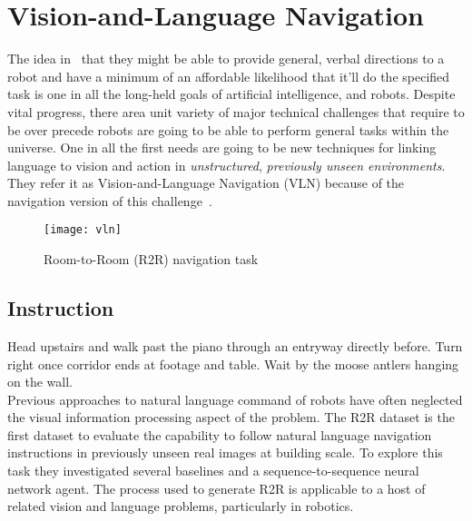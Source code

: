 \section{Vision-and-Language Navigation}
The idea in~\cite{DBLP:journals/corr/abs-1711-07280} that they might be able to provide general, verbal directions to a robot and have a minimum of an affordable likelihood that it'll do the specified task is one in all the long-held goals of artificial intelligence, and robots.
Despite vital progress, there area unit variety of major technical challenges that require to be over precede robots are going to be able to perform general tasks within the universe. One in all the first needs are going to be new techniques for linking language to vision and action in \emph{unstructured}, \emph{previously unseen environments}. They refer it as Vision-and-Language Navigation (VLN) because of the navigation version of this challenge~\cite{DBLP:journals/corr/abs-1711-07280}.

\begin{figure}[htbp]
    \centering
    \texttt{[image: vln]}
    \caption{Room-to-Room (R2R) navigation task~\cite{DBLP:journals/corr/abs-1711-07280}}
\end{figure}
\newpage
\subsection*{Instruction}
Head upstairs and walk past the piano through an entryway directly before. Turn right once corridor ends at footage and table. Wait by the moose antlers hanging on the wall.\\

Previous approaches to natural language command of robots have often neglected the visual information processing aspect of the problem. The R2R dataset is the first dataset to evaluate the capability to follow natural language navigation instructions in previously unseen real images at building scale. To explore this task they investigated several baselines and a sequence-to-sequence neural network agent.  The process used to generate R2R is applicable to a host of related vision and language problems, particularly in robotics. 
